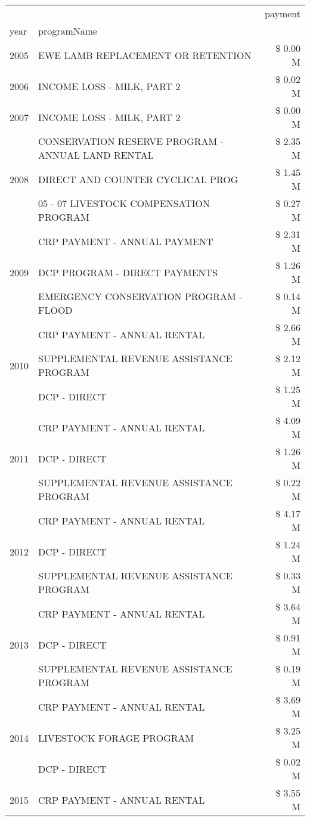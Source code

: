 \begin{tabular}{llr}
\toprule
 &  & payment \\
year & programName &  \\
\midrule
2005 & EWE LAMB REPLACEMENT OR RETENTION & \$ 0.00 M \\
\cline{1-3}
2006 & INCOME LOSS - MILK, PART 2 & \$ 0.02 M \\
\cline{1-3}
2007 & INCOME LOSS - MILK, PART 2 & \$ 0.00 M \\
\cline{1-3}
\multirow[t]{3}{*}{2008} & CONSERVATION RESERVE PROGRAM - ANNUAL LAND RENTAL & \$ 2.35 M \\
 & DIRECT AND COUNTER CYCLICAL PROG & \$ 1.45 M \\
 & 05 - 07 LIVESTOCK COMPENSATION PROGRAM & \$ 0.27 M \\
\cline{1-3}
\multirow[t]{3}{*}{2009} & CRP PAYMENT - ANNUAL PAYMENT & \$ 2.31 M \\
 & DCP PROGRAM - DIRECT PAYMENTS & \$ 1.26 M \\
 & EMERGENCY CONSERVATION PROGRAM - FLOOD & \$ 0.14 M \\
\cline{1-3}
\multirow[t]{3}{*}{2010} & CRP PAYMENT - ANNUAL RENTAL & \$ 2.66 M \\
 & SUPPLEMENTAL REVENUE ASSISTANCE PROGRAM & \$ 2.12 M \\
 & DCP - DIRECT & \$ 1.25 M \\
\cline{1-3}
\multirow[t]{3}{*}{2011} & CRP PAYMENT - ANNUAL RENTAL & \$ 4.09 M \\
 & DCP - DIRECT & \$ 1.26 M \\
 & SUPPLEMENTAL REVENUE ASSISTANCE PROGRAM & \$ 0.22 M \\
\cline{1-3}
\multirow[t]{3}{*}{2012} & CRP PAYMENT - ANNUAL RENTAL & \$ 4.17 M \\
 & DCP - DIRECT & \$ 1.24 M \\
 & SUPPLEMENTAL REVENUE ASSISTANCE PROGRAM & \$ 0.33 M \\
\cline{1-3}
\multirow[t]{3}{*}{2013} & CRP PAYMENT - ANNUAL RENTAL & \$ 3.64 M \\
 & DCP - DIRECT & \$ 0.91 M \\
 & SUPPLEMENTAL REVENUE ASSISTANCE PROGRAM & \$ 0.19 M \\
\cline{1-3}
\multirow[t]{3}{*}{2014} & CRP PAYMENT - ANNUAL RENTAL & \$ 3.69 M \\
 & LIVESTOCK FORAGE PROGRAM & \$ 3.25 M \\
 & DCP - DIRECT & \$ 0.02 M \\
\cline{1-3}
\multirow[t]{3}{*}{2015} & CRP PAYMENT - ANNUAL RENTAL & \$ 3.55 M \\

\end{tabular}

